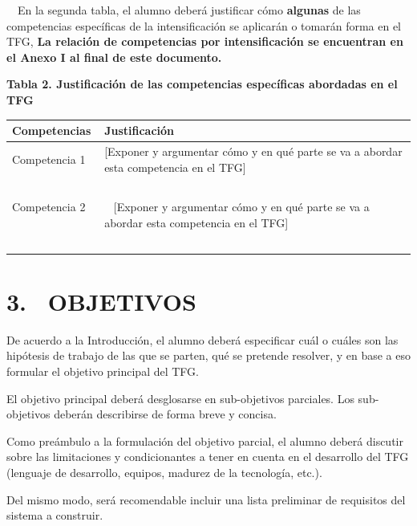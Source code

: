 \documentclass[a4paper]{article}
\begin{document}
\clearpage\pagestyle{plain}
\thispagestyle{FirstPage}

\ \ En la segunda tabla, el alumno deber\'a justificar c\'omo \textbf{algunas} de las competencias espec\'ificas de la
intensificaci\'on se aplicar\'an o tomar\'an forma en el TFG, \textbf{La relaci\'on de competencias por
intensificaci\'on se encuentran en el Anexo I al final de este documento. }


\bigskip

{\centering\bfseries
Tabla 2. Justificaci\'on de las competencias espec\'ificas abordadas en el TFG
\par}

\begin{center}
\tablefirsthead{}
\tablehead{}
\tabletail{}
\tablelasttail{}
\begin{supertabular}{m{8.849cm}m{7.605cm}}
{\color{black} \textbf{Competencias}} &
{\color{black} \textbf{Justificaci\'on}}\\\hline
{\color{black} Competencia 1} &
{\color{black} [Exponer y argumentar c\'omo y en qu\'e parte se va a abordar esta competencia en el TFG]}\\
~
 &
~
\\
Competencia 2
~
 &
~
[Exponer y argumentar c\'omo y en qu\'e parte se va a abordar esta competencia en el TFG]
\\
~
 &
~
\\\hline
\end{supertabular}
\end{center}

\bigskip

\section{3. \ OBJETIVOS}
De acuerdo a la Introducci\'on, el alumno deber\'a especificar cu\'al o cuáles son las hip\'otesis de trabajo de las
que se parten, qu\'e se pretende resolver, y en base a eso formular el objetivo principal del TFG.

El objetivo principal deber\'a desglosarse en sub-objetivos parciales. Los sub-objetivos deberán describirse de forma breve y concisa.

Como pre\'ambulo a la formulaci\'on del objetivo parcial, el alumno deber\'a discutir sobre las limitaciones y
condicionantes a tener en cuenta en el desarrollo del TFG (lenguaje de desarrollo, equipos, madurez de la tecnolog\'ia,
etc.).

Del mismo modo, ser\'a recomendable incluir una lista preliminar de requisitos del sistema a construir.
\end{document}
